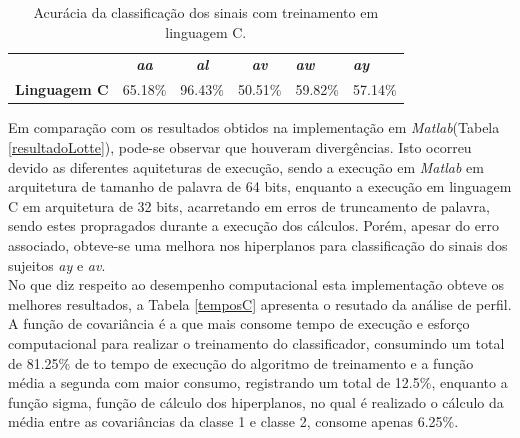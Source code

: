 \begin{table}[!h]
	\centering
	\caption{Acurácia da classificação dos sinais com treinamento em linguagem C.}
	\label{acuraciaC}
	
	\begin{tabular}{lcccll}
		\rowcolor[HTML]{DAE8FC} 
		\multicolumn{1}{c}{\cellcolor[HTML]{DAE8FC}\textbf{Sistema}} & \textit{\textbf{aa}}        & \textit{\textbf{al}}        & \textit{\textbf{av}}        & \textit{\textbf{aw}} & \textit{\textbf{ay}} \\
		\textbf{Linguagem C}                                        & \multicolumn{1}{r}{65.18\%} & \multicolumn{1}{r}{96.43\%} & \multicolumn{1}{r}{50.51\%} & 59.82\%              & 57.14\%             
	\end{tabular}
\end{table}

Em comparação com os resultados obtidos na implementação em \textit{Matlab}(Tabela \ref{resultadoLotte}), pode-se observar que houveram divergências. Isto ocorreu devido as diferentes aquiteturas de execução, sendo a execução em \textit{Matlab} em arquitetura de tamanho de palavra de 64 bits, enquanto a execução em linguagem C em arquitetura de 32 bits, acarretando em erros de truncamento de palavra, sendo estes propragados durante a execução dos cálculos. Porém, apesar do erro associado, obteve-se uma melhora nos hiperplanos para classificação do sinais dos sujeitos \textit{ay} e \textit{av}.\\

No que diz respeito ao desempenho computacional esta implementação obteve os melhores resultados, a Tabela \ref{temposC} apresenta o resutado da análise de perfil. A função de covariância é a que mais consome tempo de execução e esforço computacional para realizar o treinamento do classificador, consumindo um total de 81.25\% de to tempo de execução do algoritmo de treinamento e a função média a segunda com maior consumo, registrando um total de 12.5\%, enquanto a função sigma, função de cálculo dos hiperplanos, no qual é realizado o cálculo da média entre as covariâncias da classe 1 e classe 2, consome apenas 6.25\%.\\


